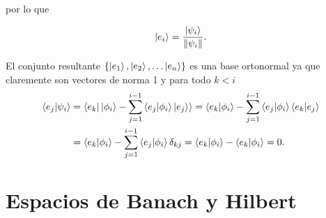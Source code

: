\documentclass[main.tex]{subfiles}
\begin{document}
\noindent por lo que

\[
\ket{e_i} = \frac{\ket{\psi_i}}{\Vert\psi_i\Vert}.
\]

El conjunto resultante \(\{\ket{e_1}, \ket{e_2},\dots \ket{e_n}\}\) es una base ortonormal ya que claremente son vectores de norma 1 y para todo \(k<i\)
\begin{align*}
\braket{e_j|\psi_i}&=\braket{e_k|\ket{\phi_i} - \sum_{j=1}^{i-1} \braket{e_j | \phi_i} \ket{e_j}}= \braket{e_k|\phi_i}-\sum_{j=1}^{i-1} \braket{e_j | \phi_i} \braket{e_k|e_j}\\
                   &=\braket{e_k|\phi_i}-\sum_{j=1}^{i-1} \braket{e_j | \phi_i} \delta_{kj}=\braket{e_k|\phi_i}-\braket{e_k | \phi_i}=0.
\end{align*}

\section{Espacios de Banach y Hilbert}
\end{document}
